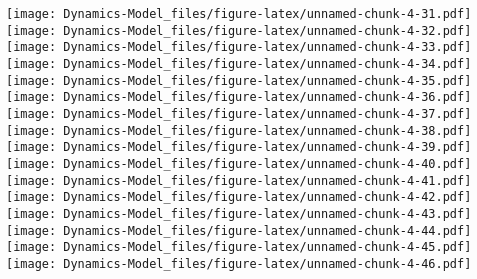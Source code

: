 \documentclass[12pt]{article}
\begin{document}
\texttt{[image: Dynamics-Model\_files/figure-latex/unnamed-chunk-4-31.pdf]}
\texttt{[image: Dynamics-Model\_files/figure-latex/unnamed-chunk-4-32.pdf]}
\texttt{[image: Dynamics-Model\_files/figure-latex/unnamed-chunk-4-33.pdf]}
\texttt{[image: Dynamics-Model\_files/figure-latex/unnamed-chunk-4-34.pdf]}
\texttt{[image: Dynamics-Model\_files/figure-latex/unnamed-chunk-4-35.pdf]}
\texttt{[image: Dynamics-Model\_files/figure-latex/unnamed-chunk-4-36.pdf]}
\texttt{[image: Dynamics-Model\_files/figure-latex/unnamed-chunk-4-37.pdf]}
\texttt{[image: Dynamics-Model\_files/figure-latex/unnamed-chunk-4-38.pdf]}
\texttt{[image: Dynamics-Model\_files/figure-latex/unnamed-chunk-4-39.pdf]}
\texttt{[image: Dynamics-Model\_files/figure-latex/unnamed-chunk-4-40.pdf]}
\texttt{[image: Dynamics-Model\_files/figure-latex/unnamed-chunk-4-41.pdf]}
\texttt{[image: Dynamics-Model\_files/figure-latex/unnamed-chunk-4-42.pdf]}
\texttt{[image: Dynamics-Model\_files/figure-latex/unnamed-chunk-4-43.pdf]}
\texttt{[image: Dynamics-Model\_files/figure-latex/unnamed-chunk-4-44.pdf]}
\texttt{[image: Dynamics-Model\_files/figure-latex/unnamed-chunk-4-45.pdf]}
\texttt{[image: Dynamics-Model\_files/figure-latex/unnamed-chunk-4-46.pdf]}



\end{document}
